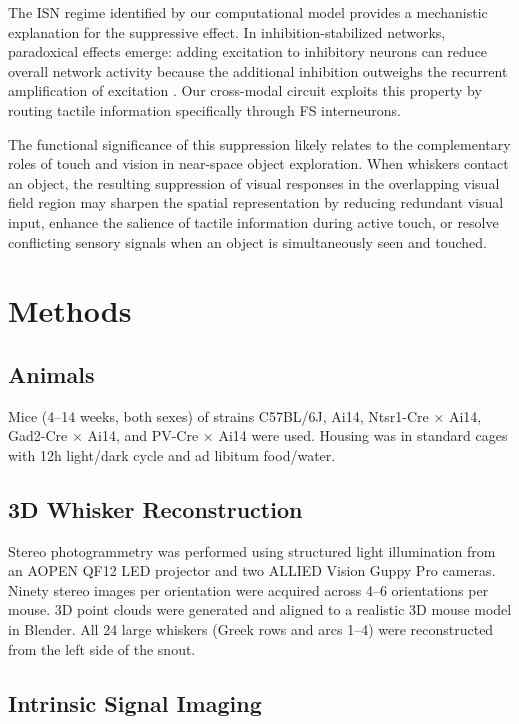 \documentclass[11pt]{article}
\begin{document}
The ISN regime identified by our computational model provides a mechanistic explanation for the suppressive effect. In inhibition-stabilized networks, paradoxical effects emerge: adding excitation to inhibitory neurons can reduce overall network activity because the additional inhibition outweighs the recurrent amplification of excitation \citep{ozeki2009inhibitory, rubin2015stabilized}. Our cross-modal circuit exploits this property by routing tactile information specifically through FS interneurons.

The functional significance of this suppression likely relates to the complementary roles of touch and vision in near-space object exploration. When whiskers contact an object, the resulting suppression of visual responses in the overlapping visual field region may sharpen the spatial representation by reducing redundant visual input, enhance the salience of tactile information during active touch, or resolve conflicting sensory signals when an object is simultaneously seen and touched.

\section{Methods}

\subsection{Animals}

Mice (4--14 weeks, both sexes) of strains C57BL/6J, Ai14, Ntsr1-Cre $\times$ Ai14, Gad2-Cre $\times$ Ai14, and PV-Cre $\times$ Ai14 were used. Housing was in standard cages with 12h light/dark cycle and ad libitum food/water.

\subsection{3D Whisker Reconstruction}

Stereo photogrammetry was performed using structured light illumination from an AOPEN QF12 LED projector and two ALLIED Vision Guppy Pro cameras. Ninety stereo images per orientation were acquired across 4--6 orientations per mouse. 3D point clouds were generated and aligned to a realistic 3D mouse model in Blender. All 24 large whiskers (Greek rows and arcs 1--4) were reconstructed from the left side of the snout.

\subsection{Intrinsic Signal Imaging}
\end{document}
